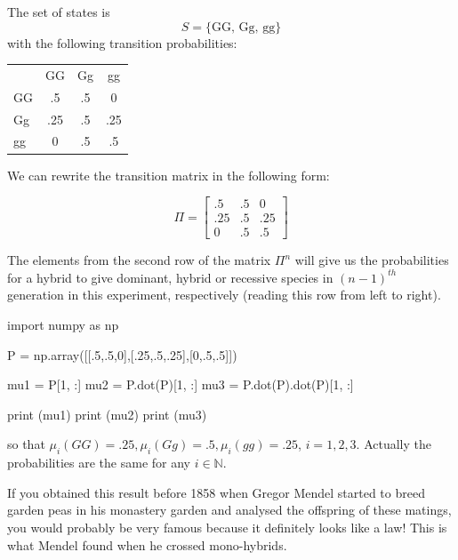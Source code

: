 \cprotEnv\begin{solution}
The set of states is 
\begin{equation*}
	S = \{\textrm{GG, Gg, gg}\}
\end{equation*}
with the following transition probabilities:

\begin{table}[htbp]
\centering
\begin{tabular}{l c c c}
&GG& Gg & gg \\
GG & .5 & .5 & 0 \\
Gg & .25 & .5 & .25 \\
gg & 0 & .5 & .5 \\
\end{tabular}
\end{table}
\noindent
We can rewrite the transition matrix in the following form:

\begin{equation*}
\Pi =
\begin{bmatrix}
.5 &.5 &0\\
.25 &.5 &.25\\
0 &.5 &.5
\end{bmatrix}
\end{equation*}

The elements from the second row of the matrix $\Pi^n$ will give us the probabilities for a hybrid to give dominant, hybrid or recessive species in $(n − 1)^{th}$ generation in this experiment, respectively (reading this row from left to right).
\begin{ipython}
import numpy as np

P = np.array([[.5,.5,0],[.25,.5,.25],[0,.5,.5]])

mu1 = P[1, :]
mu2 = P.dot(P)[1, :]
mu3 = P.dot(P).dot(P)[1, :]

print (mu1)
print (mu2)
print (mu3)
\end{ipython}
\begin{ioutput}
[0.25 0.5  0.25]
[0.25 0.5  0.25]
[0.25 0.5  0.25]
\end{ioutput}
so that $\mu_i(GG) = .25, \mu_i(Gg) = .5, \mu_i(gg) = .25$, $i = 1, 2, 3$.
Actually the probabilities are the same for any $i \in \mathbb{N}$. 

If you obtained this result before 1858 when Gregor Mendel started to breed garden peas in his monastery garden and analysed the offspring of these matings, you would probably be very famous because it definitely looks like a law! This is what Mendel found when he crossed mono-hybrids.
\end{solution}
